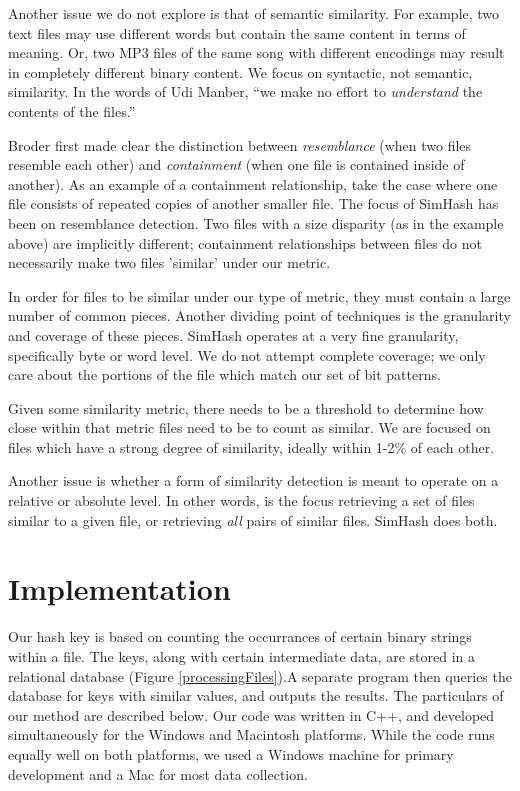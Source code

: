 \documentclass[10pt, twocolumn]{article}
\begin{document}
Another issue we do not explore is that of semantic similarity. For example, two text files may use different words but contain the same content in terms of meaning. Or, two MP3 files of the same song with different encodings may result in completely different binary content.  We focus on syntactic, not semantic, similarity. In the words of Udi Manber, ``we make no effort to \emph{understand} the contents of the files.'' \cite{manber}

Broder \cite{broder} first made clear the distinction between \emph{resemblance} (when two files resemble each other) and \emph{containment} (when one file is contained inside of another). As an example of a containment relationship, take the case where one file consists of repeated copies of another smaller file. The focus of SimHash has been on resemblance detection. Two files with a size disparity (as in the example above) are implicitly different; containment relationships between files do not necessarily make two files 'similar' under our metric.

In order for files to be similar under our type of metric, they must contain a large number of common pieces. Another dividing point of techniques is the granularity and coverage of these pieces. SimHash operates at a very fine granularity, specifically byte or word level. We do not attempt complete coverage; we only care about the portions of the file which match our set of bit patterns.

Given some similarity metric, there needs to be a threshold to determine how close within that metric files need to be to count as similar. We are focused on files which have a strong degree of similarity, ideally within 1-2\% of each other.

Another issue is whether a form of similarity detection is meant to operate on a relative or absolute level. In other words, is the focus retrieving a set of files similar to a given file, or retrieving \emph{all} pairs of similar files. SimHash does both.


\section{Implementation}

Our hash key is based on counting the occurrances of certain binary strings within a file.  The keys, along with certain intermediate data, are stored in a relational database (Figure \ref{processingFiles}).A separate program then queries the database for keys with similar values, and outputs the results.  The particulars of our method are described below.  Our code was written in C++, and developed simultaneously for the Windows and Macintosh platforms. While the code runs equally well on both platforms, we used a Windows machine for primary development and a Mac for most data collection.
\end{document}
